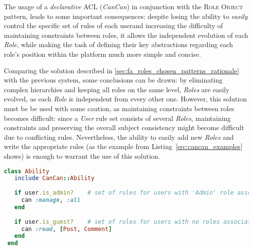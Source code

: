 The usage of a \emph{declarative} ACL (\emph{CanCan}) in conjunction with the \textsc{Role Object} pattern, leads to some important consequences: despite losing the ability to \emph{easily} control the specific set of rules of each user\footnotemark and increasing the difficulty of maintaining constraints between roles, it allows the independent evolution of each \emph{Role}, while making the task of defining their key abstractions regarding each role's position within the platform much more simple and concise.

Comparing the solution described in \ref{sec:fa_roles_chosen_patterns_rationale} with the previous system, some conclusions can be drawn: by eliminating complex hierarchies and keeping all roles on the same level, \emph{Roles} are easily evolved, as each \emph{Role} is independent from every other one. However, this solution must be be used with some caution, as maintaining constraints between roles becomes difficult: since a \emph{User} rule set consists of several \emph{Roles}, maintaining constraints and preserving the overall subject consistency might become difficult due to conflicting rules. Nevertheless, the ability to easily add new \emph{Roles} and write the appropriate rules (as the example from Listing~\ref{src:cancan_examples} shows) is enough to warrant the use of this solution.

\begin{lstlisting}[language=ruby, float=htb, label=src:cancan_examples, caption=CanCan rule definition example.]
 class Ability
   include CanCan::Ability
 
   if user.is_admin?    # set of rules for users with 'Admin' role associated
     can :manage, :all
   end
   
   if user.is_guest?    # set of rules for users with no roles associated
     can :read, [Post, Comment]
   end
 end
\end{lstlisting}







